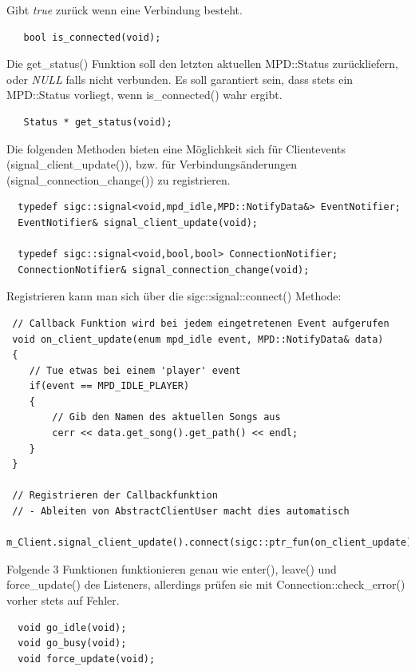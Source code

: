 Gibt \textit{true} zurück wenn eine Verbindung besteht.
\begin{verbatim}
   bool is_connected(void);
\end{verbatim}

Die get\_status() Funktion soll den letzten aktuellen MPD::Status zurückliefern,
oder \emph{NULL} falls nicht verbunden. Es soll garantiert sein, dass stets ein MPD::Status vorliegt,
wenn is\_connected() wahr ergibt.
\begin{verbatim}        
   Status * get_status(void);
\end{verbatim}

Die folgenden Methoden bieten eine Möglichkeit sich für Clientevents (signal\_client\_update()),
 bzw. für Verbindungsänderungen (signal\_connection\_change()) zu registrieren. 
\begin{verbatim}
  typedef sigc::signal<void,mpd_idle,MPD::NotifyData&> EventNotifier;
  EventNotifier& signal_client_update(void);
        
  typedef sigc::signal<void,bool,bool> ConnectionNotifier;
  ConnectionNotifier& signal_connection_change(void);
\end{verbatim}

Registrieren kann man sich über die sigc::signal::connect() Methode:
\begin{verbatim}
 // Callback Funktion wird bei jedem eingetretenen Event aufgerufen
 void on_client_update(enum mpd_idle event, MPD::NotifyData& data)
 {
    // Tue etwas bei einem 'player' event
    if(event == MPD_IDLE_PLAYER)
    {
        // Gib den Namen des aktuellen Songs aus
        cerr << data.get_song().get_path() << endl;
    }
 }

 // Registrieren der Callbackfunktion
 // - Ableiten von AbstractClientUser macht dies automatisch
 m_Client.signal_client_update().connect(sigc::ptr_fun(on_client_update));
\end{verbatim}

Folgende 3 Funktionen funktionieren genau wie enter(), leave() und force\_update() des Listeners,
allerdings prüfen sie mit Connection::check\_error() vorher stets auf Fehler.
\begin{verbatim}
  void go_idle(void);
  void go_busy(void);
  void force_update(void);
\end{verbatim}

